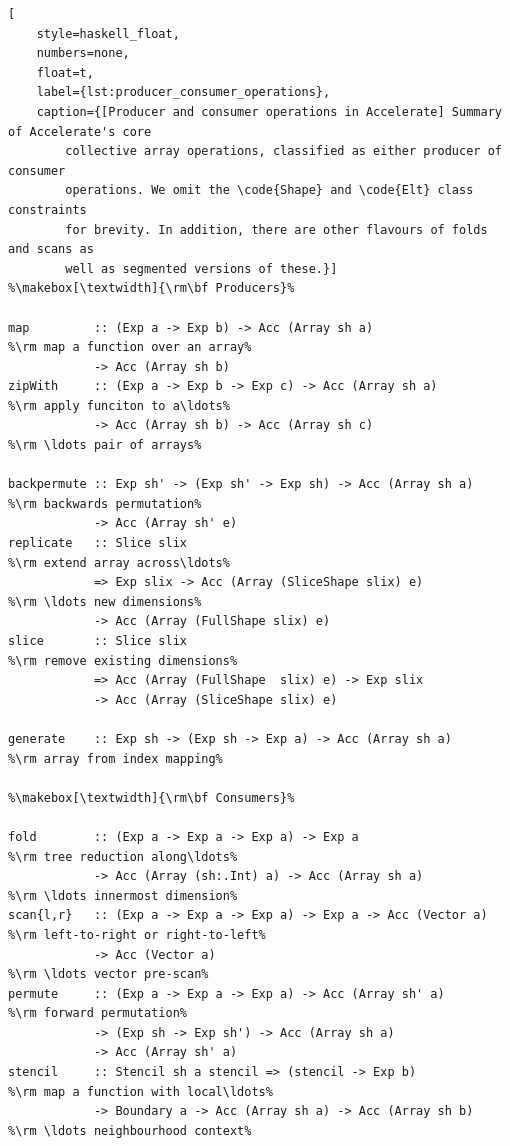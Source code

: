 \begin{lstlisting}[
    style=haskell_float,
    numbers=none,
    float=t,
    label={lst:producer_consumer_operations},
    caption={[Producer and consumer operations in Accelerate] Summary of Accelerate's core
        collective array operations, classified as either producer of consumer
        operations. We omit the \code{Shape} and \code{Elt} class constraints
        for brevity. In addition, there are other flavours of folds and scans as
        well as segmented versions of these.}]
%\makebox[\textwidth]{\rm\bf Producers}%

map         :: (Exp a -> Exp b) -> Acc (Array sh a)                   %\rm map a function over an array%
            -> Acc (Array sh b)
zipWith     :: (Exp a -> Exp b -> Exp c) -> Acc (Array sh a)          %\rm apply funciton to a\ldots%
            -> Acc (Array sh b) -> Acc (Array sh c)                   %\rm \ldots pair of arrays%

backpermute :: Exp sh' -> (Exp sh' -> Exp sh) -> Acc (Array sh a)     %\rm backwards permutation%
            -> Acc (Array sh' e)
replicate   :: Slice slix                                             %\rm extend array across\ldots%
            => Exp slix -> Acc (Array (SliceShape slix) e)            %\rm \ldots new dimensions%
            -> Acc (Array (FullShape slix) e)
slice       :: Slice slix                                             %\rm remove existing dimensions%
            => Acc (Array (FullShape  slix) e) -> Exp slix
            -> Acc (Array (SliceShape slix) e)

generate    :: Exp sh -> (Exp sh -> Exp a) -> Acc (Array sh a)        %\rm array from index mapping%

%\makebox[\textwidth]{\rm\bf Consumers}%

fold        :: (Exp a -> Exp a -> Exp a) -> Exp a                     %\rm tree reduction along\ldots%
            -> Acc (Array (sh:.Int) a) -> Acc (Array sh a)            %\rm \ldots innermost dimension%
scan{l,r}   :: (Exp a -> Exp a -> Exp a) -> Exp a -> Acc (Vector a)   %\rm left-to-right or right-to-left%
            -> Acc (Vector a)                                         %\rm \ldots vector pre-scan%
permute     :: (Exp a -> Exp a -> Exp a) -> Acc (Array sh' a)         %\rm forward permutation%
            -> (Exp sh -> Exp sh') -> Acc (Array sh a)
            -> Acc (Array sh' a)
stencil     :: Stencil sh a stencil => (stencil -> Exp b)             %\rm map a function with local\ldots%
            -> Boundary a -> Acc (Array sh a) -> Acc (Array sh b)     %\rm \ldots neighbourhood context%
\end{lstlisting}

